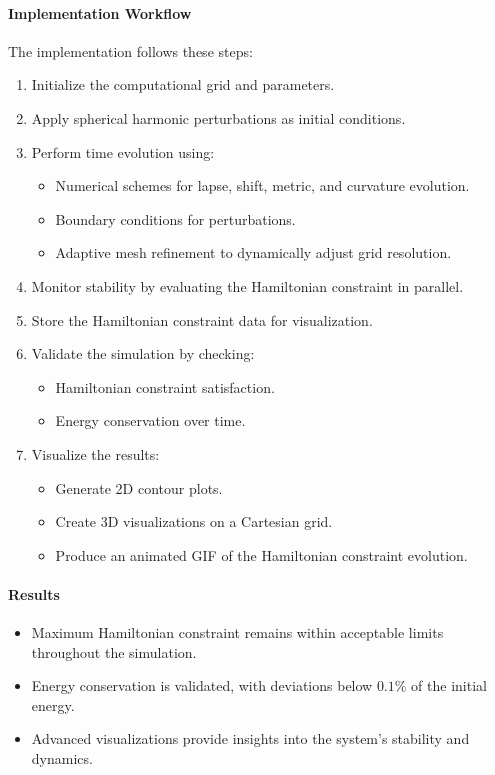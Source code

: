 \documentclass[12pt]{article}
\begin{document}
\paragraph{Implementation Workflow}
The implementation follows these steps:
\begin{enumerate}
    \item Initialize the computational grid and parameters.
    \item Apply spherical harmonic perturbations as initial conditions.
    \item Perform time evolution using:
    \begin{itemize}
        \item Numerical schemes for lapse, shift, metric, and curvature evolution.
        \item Boundary conditions for perturbations.
        \item Adaptive mesh refinement to dynamically adjust grid resolution.
    \end{itemize}
    \item Monitor stability by evaluating the Hamiltonian constraint in parallel.
    \item Store the Hamiltonian constraint data for visualization.
    \item Validate the simulation by checking:
    \begin{itemize}
        \item Hamiltonian constraint satisfaction.
        \item Energy conservation over time.
    \end{itemize}
    \item Visualize the results:
    \begin{itemize}
        \item Generate 2D contour plots.
        \item Create 3D visualizations on a Cartesian grid.
        \item Produce an animated GIF of the Hamiltonian constraint evolution.
    \end{itemize}
\end{enumerate}

\paragraph{Results}
\begin{itemize}
    \item Maximum Hamiltonian constraint remains within acceptable limits throughout the simulation.
    \item Energy conservation is validated, with deviations below $0.1\%$ of the initial energy.
    \item Advanced visualizations provide insights into the system's stability and dynamics.
\end{itemize}
\end{document}
